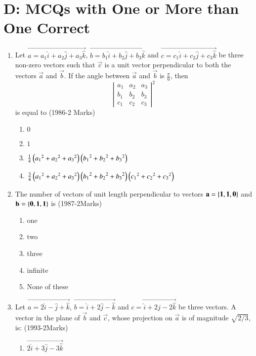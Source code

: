 \documentclass[journal,12pt,twocolumn]{IEEEtran}
\theoremstyle{remark}
\begin{document}
 \section{D: MCQs with One or More than One Correct}
\begin{enumerate}
	\item %
		Let $\vec{a=a_1\hat{i}+a_2\hat{j}+a_3\hat{k}}$, $\vec{b=b_1\hat{i}+b_2\hat{j}+b_3\hat{k}}$ and $\vec{c=c_1\hat{i}+c_2\hat{j}+c_3\hat{k}}$ be three non-zero vectors such that $\vec{c}$ is a unit vector perpendicular to both the vectors $\vec{a}$ and $\vec{b}$. If the angle between $\vec{a}$ and $\vec{b}$ is $\frac{\pi}{6}$, then \\
\[
\left| \begin{matrix}
a_1 & a_2 & a_3 \\
b_1 & b_2 & b_3 \\
c_1 & c_2 & c_3
\end{matrix} \right|^2
\]
 is equal to \hfill{(1986-2 Marks)}\\
		\begin{enumerate}
			\item $0$
			\item $1$
			\item $\frac{1}{4}\left({a_1}^2+{a_2}^2+{a_3}^2\right)\left({b_1}^2+{b_2}^2+{b_3}^2\right)$
			\item $\frac{3}{4}\left({a_1}^2+{a_2}^2+{a_3}^2\right)\left({b_1}^2+{b_2}^2+{b_3}^2\right)\left({c_1}^2+{c_2}^2+{c_3}^2\right)$
		\end{enumerate}
\item %
	The number of vectors of unit length perpendicular to vectors $\mathbf{a=\left\{1,1,0\right\}}$ and $\mathbf{b=\left\{0,1,1\right\}}$ is \hfill{(1987-2Marks)}\\
		\begin{enumerate}
			\item one
		        \item two
			\item three
			\item infinite
			\item None of these
		\end{enumerate}
\item %
	Let $\vec{a=2\hat{i}-\hat{j}+\hat{k}}$, $\vec{b=\hat{i}+2\hat{j}-\hat{k}}$ and $\vec{c=\hat{i}+2\hat{j}-2\hat{k}}$ be three vectors. A vector in the plane of $\vec{b}$ and $\vec{c}$, whose projection on $\vec{a}$ is of magnitude $\sqrt{2/3}$, is: \hfill{(1993-2Marks)}\\
		\begin{enumerate}
			\item $\vec{2\hat{i}+3\hat{j}-3\hat{k}}$

\end{enumerate}
\end{enumerate}
\end{document}

